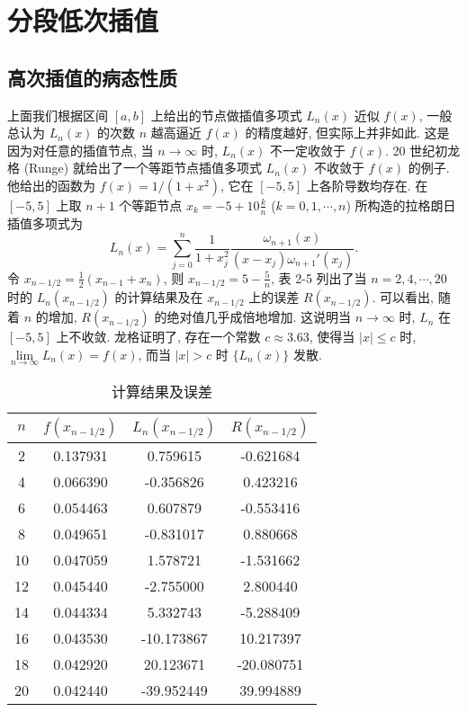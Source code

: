 \documentclass[../../main.tex]{subfiles}
\begin{document}
\section{分段低次插值}

\subsection{高次插值的病态性质}

上面我们根据区间 $[a, b]$ 上给出的节点做插值多项式 $L_n(x)$ 近似 $f(x)$, 一般总认为 $L_n(x)$ 的次数 $n$ 越高逼近 $f(x)$ 的精度越好, 但实际上并非如此. 这是因为对任意的插值节点, 当 $n \to \infty$ 时, $L_n(x)$ 不一定收敛于 $f(x)$. 20 世纪初龙格 (Runge) 就给出了一个等距节点插值多项式 $L_n(x)$ 不收敛于 $f(x)$ 的例子. 他给出的函数为 $f(x) = 1/(1 + x^2)$, 它在 $[-5, 5]$ 上各阶导数均存在. 在 $[-5, 5]$ 上取 $n + 1$ 个等距节点 $x_k = -5 + 10 \frac{k}{n}$ ($k = 0, 1, \cdots, n$) 所构造的拉格朗日插值多项式为
\[
L_n(x) = \sum_{j=0}^n \frac{1}{1 + x_j^2} \frac{\omega_{n+1}(x)}{(x - x_j) \omega_{n+1}'(x_j)}.
\]
令 $x_{n - 1/2} = \frac{1}{2}(x_{n - 1} + x_n)$, 则 $x_{n - 1/2} = 5 - \frac{5}{n}$, 表 2-5 列出了当 $n = 2, 4, \cdots, 20$ 时的 $L_n(x_{n - 1/2})$ 的计算结果及在 $x_{n - 1/2}$ 上的误差 $R(x_{n - 1/2})$. 可以看出, 随着 $n$ 的增加, $R(x_{n - 1/2})$ 的绝对值几乎成倍地增加. 这说明当 $n \to \infty$ 时, $L_n$ 在 $[-5, 5]$ 上不收敛. 龙格证明了, 存在一个常数 $c \approx 3.63$, 使得当 $|x| \leqslant c$ 时, $\lim\limits_{n \to \infty} L_n(x) = f(x)$, 而当 $|x| > c$ 时 $\{L_n(x)\}$ 发散.
\begin{table}[H]
\centering
\caption{计算结果及误差}
\begin{tabular}{c|c|c|c}
\toprule
$n$ & $f(x_{n - 1/2})$ & $L_n(x_{n - 1/2})$ & $R(x_{n - 1/2})$ \\
\midrule
2  & 0.137931 & 0.759615   & -0.621684  \\
4  & 0.066390 & -0.356826  & 0.423216   \\
6  & 0.054463 & 0.607879   & -0.553416  \\
8  & 0.049651 & -0.831017  & 0.880668   \\
10 & 0.047059 & 1.578721   & -1.531662  \\
12 & 0.045440 & -2.755000  & 2.800440   \\
14 & 0.044334 & 5.332743   & -5.288409 \\
16 & 0.043530 & -10.173867 & 10.217397  \\
18 & 0.042920 & 20.123671  & -20.080751 \\
20 & 0.042440 & -39.952449 & 39.994889  \\
\bottomrule
\end{tabular}
\end{table}
\end{document}
